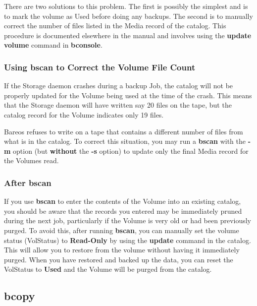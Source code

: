 There are two solutions to this problem. The first is possibly the simplest
and is to mark the volume as Used before doing any backups.  The second is
to manually correct the number of files listed in the Media record of the
catalog.  This procedure is documented elsewhere in the manual and involves
using the {\bf update volume} command in {\bf bconsole}.

\subsubsection{Using bscan to Correct the Volume File Count}

If the Storage daemon crashes during a backup Job, the catalog will not be
properly updated for the Volume being used at the time of the crash. This
means that the Storage daemon will have written say 20 files on the tape, but
the catalog record for the Volume indicates only 19 files.

Bareos refuses to write on a tape that contains a different number of files
from what is in the catalog. To correct this situation, you may run a {\bf
bscan} with the {\bf -m} option (but {\bf without} the {\bf -s} option) to
update only the final Media record for the Volumes read.

\subsubsection{After bscan}

If you use {\bf bscan} to enter the contents of the Volume into an existing
catalog, you should be aware that the records you entered may be immediately
pruned during the next job, particularly if the Volume is very old or had been
previously purged. To avoid this, after running {\bf bscan}, you can manually
set the volume status (VolStatus) to {\bf Read-Only} by using the {\bf update}
command in the catalog. This will allow you to restore from the volume without
having it immediately purged. When you have restored and backed up the data,
you can reset the VolStatus to {\bf Used} and the Volume will be purged from
the catalog.

\subsection{bcopy}
\label{bcopy}

